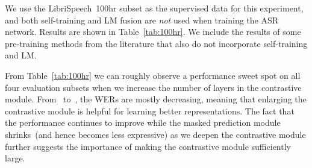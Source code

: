\documentclass{article}
\begin{document}
We use the LibriSpeech~100hr subset as the supervised data for this experiment, and both self-training and LM fusion are {\it not} used when training the ASR network.
Results are shown in Table~\ref{tab:100hr}.
We include the results of some pre-training methods from the literature that also do not incorporate self-training and LM.

\begin{table}[htbp]
  \caption{WERs~(\%) when using the LibriSpeech~100hr subset as supervised data. For all methods, both self-training and LM fusion are not used. References are where the numbers are quoted from.}
  \vskip 0.1in
  \label{tab:100hr}
  \centering
\end{table}

From Table~\ref{tab:100hr} we can roughly observe a performance sweet spot on all four evaluation subsets when we increase the number of layers in the contrastive module.
From~ to~, the WERs are mostly decreasing, meaning that enlarging the contrastive module is helpful for learning better representations.
The fact that the performance continues to improve while the masked prediction module shrinks~(and hence becomes less expressive) as we deepen the contrastive module further suggests the importance of making the contrastive module sufficiently large.
\end{document}
